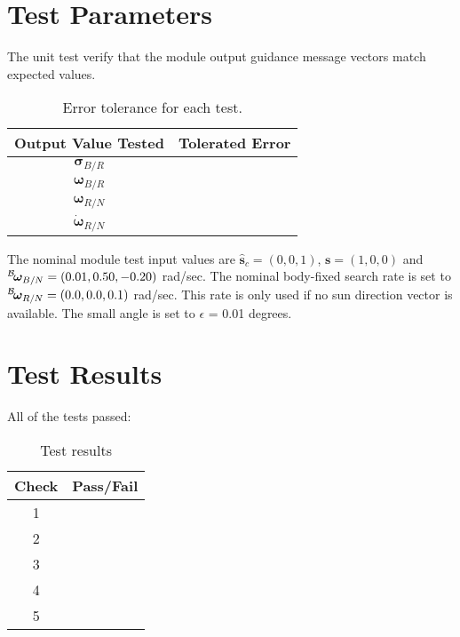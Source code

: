 \section{Test Parameters}
The unit test verify that the module output guidance message vectors match expected values.
\begin{table}[htbp]
	\caption{Error tolerance for each test.}
	\label{tab:errortol}
	\centering \fontsize{10}{10}\selectfont
	\begin{tabular}{ c | c } %
		\hline\hline
		\textbf{Output Value Tested}  & \textbf{Tolerated Error}  \\ 
		\hline
		$\bm\sigma_{B/R}$        & 	   \\ 
		$\bm\omega_{B/R}$        & \\ 
		$\bm\omega_{R/N}$        &  \\ 
		$\dot{\bm\omega}_{R/N}$        &   \\ 
		\hline\hline
	\end{tabular}
\end{table}

The nominal module test input values are $\hat{\bm s}_{c} = (0,0,1)$, $\bm s = (1,0,0)$ and $\leftexp{B}{\bm\omega}_{B/N} = (0.01, 0.50, -0.20)$ rad/sec.  The nominal body-fixed search rate is set to $\leftexp{B}{\bm\omega}_{R/N} = (0.0, 0.0, 0.1)$ rad/sec.  This rate is only used if no sun direction vector is available.  The small angle is set to $\epsilon$ = 0.01 degrees.  



\section{Test Results}

All of the tests passed:
\begin{table}[H]
	\caption{Test results}
	\label{tab:results}
	\centering \fontsize{10}{10}\selectfont
	\begin{tabular}{c | c  } %
		\hline\hline
		\textbf{Check} 						  		&\textbf{Pass/Fail} \\ 
		\hline
	   1	   			&  \\ 
	   2	   			&  \\ 
	   3	   			&  \\ 
	   4	   			&  \\ 
	   5	   			&  \\ 
	   \hline\hline
	\end{tabular}
\end{table}



